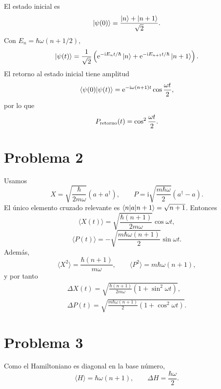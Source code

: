 \documentclass[11pt,a4paper]{article}
\numberwithin{equation}{section}
\renewcommand{\boxed}[1]{#1}
\newcommand{\ii}{\mathrm i}
\newcommand{\e}{\mathrm e}
\newcommand{\hb}{\hbar}
\begin{document}
El estado inicial es
\begin{equation}
\ket{\psi(0)}=\frac{\ket n+\ket{n+1}}{\sqrt2}.
\end{equation}
Con $E_n=\hb\omega(n+1/2)$,
\begin{equation}
\boxed{\ket{\psi(t)}=\frac1{\sqrt2}
\left(\e^{-\ii E_nt/\hb}\ket n+\e^{-\ii E_{n+1}t/\hb}\ket{n+1}\right).}
\end{equation}
El retorno al estado inicial tiene amplitud
\begin{equation}
\braket{\psi(0)|\psi(t)}=\e^{-\ii\omega(n+1)t}\cos\frac{\omega t}{2},
\end{equation}
por lo que
\begin{equation}
\boxed{P_{\rm retorno}(t)=\cos^2\frac{\omega t}{2}.}
\end{equation}

\section{Problema 2}
Usamos
\begin{equation}
X=\sqrt{\frac{\hb}{2m\omega}}(a+a^\dagger),\qquad
P=\ii\sqrt{\frac{m\hb\omega}{2}}(a^\dagger-a).
\end{equation}
El único elemento cruzado relevante es $\braket{n|a|n+1}=\sqrt{n+1}$. Entonces
\begin{equation}
\boxed{\langle X(t)\rangle=\sqrt{\frac{\hb(n+1)}{2m\omega}}\cos\omega t,}
\end{equation}
\begin{equation}
\boxed{\langle P(t)\rangle=-\sqrt{\frac{m\hb\omega(n+1)}{2}}\sin\omega t.}
\end{equation}
Además,
\begin{equation}
\langle X^2\rangle=\frac{\hb(n+1)}{m\omega},\qquad
\langle P^2\rangle=m\hb\omega(n+1),
\end{equation}
y por tanto
\begin{align}
\boxed{\Delta X(t)=\sqrt{\frac{\hb(n+1)}{2m\omega}\left(1+\sin^2\omega t\right)},}\\
\boxed{\Delta P(t)=\sqrt{\frac{m\hb\omega(n+1)}{2}\left(1+\cos^2\omega t\right)}.}
\end{align}

\section{Problema 3}
Como el Hamiltoniano es diagonal en la base número,
\begin{equation}
\boxed{\langle H\rangle=\hb\omega(n+1),\qquad
\Delta H=\frac{\hb\omega}{2}.}
\end{equation}
\end{document}
